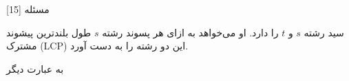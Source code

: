 ‌مسئله [15]


% 
%
%
% 

سید رشته $s$ و $t$ را دارد.
او می‌خواهد به ازای هر پسوند رشته $s$  
طول بلندترین پیشوند مشترک
(LCP)
این دو رشته را به دست آورد.

به عبارت دیگر 

\solution{

}




